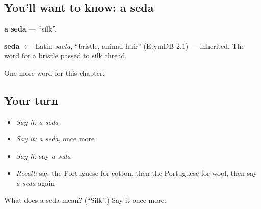 \subsection*{You'll want to know: a seda}
\textbf{a seda} — \textquotedblleft{}silk\textquotedblright{}.

\begin{cousinweb}
\textbf{seda} $\leftarrow$ Latin \emph{saeta}, \textquotedblleft{}bristle, animal hair\textquotedblright{} (EtymDB 2.1) — inherited. The word for a bristle passed to silk thread.
\end{cousinweb}

\begin{grammarlens}[title={What you've built}]
One more word for this chapter.
\end{grammarlens}

\subsection*{Your turn}
\begin{itemize}
\raggedright
  \item \emph{Say it:} \emph{a seda}
  \item \emph{Say it:} \emph{a seda}, once more
  \item \emph{Say it:} say \emph{a seda}
  \item \emph{Recall:} say the Portuguese for cotton, then the Portuguese for wool, then say \emph{a seda} again
\end{itemize}

\begin{tcolorbox}[breakable,colback=teal!4,colframe=teal!35!black,title={Before you move on}]
What does a seda mean? (\textquotedblleft{}Silk\textquotedblright{}.) Say it once more.
\end{tcolorbox}
